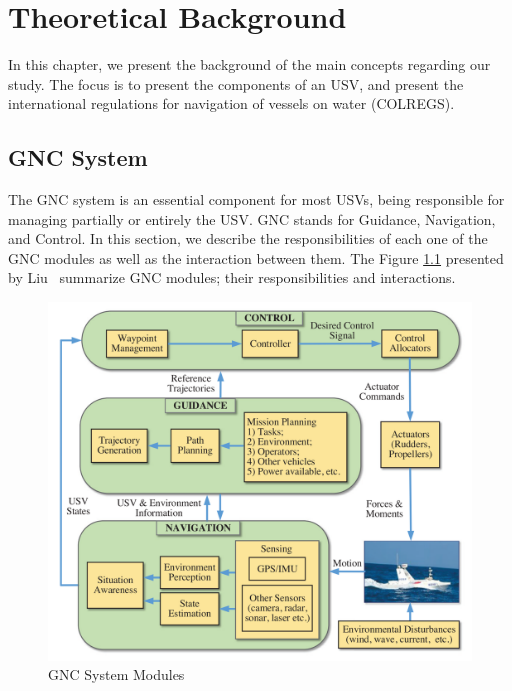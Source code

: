 \chapter{Theoretical Background \label{chap:2_TheoreticalBackground}}

    In this chapter, we present the background of the main concepts regarding our study. The focus is to present the components of an \acl{USV}, and present the international regulations for navigation of vessels on water (\acs{COLREGS}).

\section{GNC System}
    
    The \acs{GNC} system is an essential component for most \acp{USV}, being responsible for managing partially or entirely the \ac{USV}. \acs{GNC} stands for Guidance, Navigation, and Control. In this section, we describe the responsibilities of each one of the \ac{GNC} modules as well as the interaction between them. The Figure \ref{fig:Liu2016Unmanned_GNCSystem} presented by Liu~\cite{Liu2016Unmanned} summarize \acs{GNC} modules; their responsibilities and interactions.
    
    \begin{figure}[H]
        \centering
        \includegraphics[scale=0.85]{figs/Chap2/Liu2016Unmanned_GNCSystem.png}
        \caption{\ac{GNC} System Modules~\cite{Liu2016Unmanned}}
        \label{fig:Liu2016Unmanned_GNCSystem}
    \end{figure}
    
